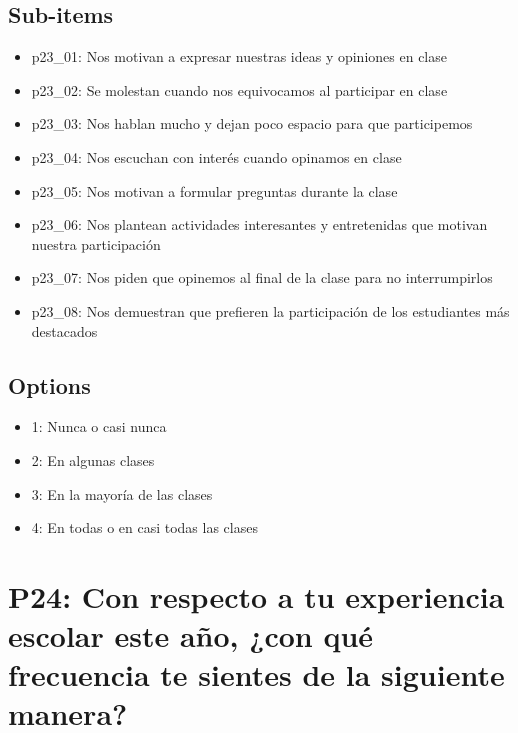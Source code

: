 \documentclass[11pt]{article}
\begin{document}
\subsection*{Sub-items}
\begin{itemize}[leftmargin=*]
  \item p23\_01: Nos motivan a expresar nuestras ideas y opiniones en clase
  \item p23\_02: Se molestan cuando nos equivocamos al participar en clase
  \item p23\_03: Nos hablan mucho y dejan poco espacio para que participemos
  \item p23\_04: Nos escuchan con interés cuando opinamos en clase
  \item p23\_05: Nos motivan a formular preguntas durante la clase
  \item p23\_06: Nos plantean actividades interesantes y entretenidas que motivan nuestra participación
  \item p23\_07: Nos piden que opinemos al final de la clase para no interrumpirlos
  \item p23\_08: Nos demuestran que prefieren la participación de los estudiantes más destacados
\end{itemize}
\subsection*{Options}
\begin{itemize}[leftmargin=*]
  \item 1: Nunca o casi nunca
  \item 2: En algunas clases
  \item 3: En la mayoría de las clases
  \item 4: En todas o en casi todas las clases
\end{itemize}
\bigskip
\section*{P24: Con respecto a tu experiencia escolar este año, ¿con qué frecuencia te sientes de la siguiente manera?}
\end{document}
